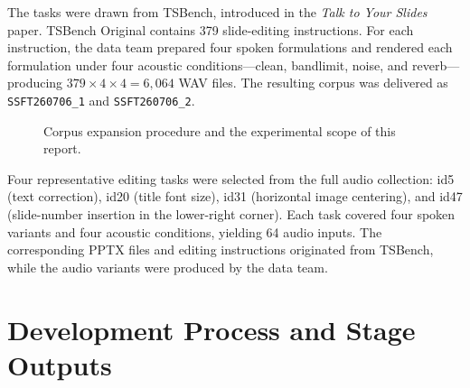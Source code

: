 \documentclass[11pt,a4paper,UTF8,fontset=fandol]{ctexart}
\begin{document}
The tasks were drawn from TSBench, introduced in the \textit{Talk to Your Slides} paper. TSBench Original contains 379 slide-editing instructions. For each instruction, the data team prepared four spoken formulations and rendered each formulation under four acoustic conditions---clean, bandlimit, noise, and reverb---producing $379\times4\times4=6{,}064$ WAV files. The resulting corpus was delivered as \texttt{SSFT260706\_1} and \texttt{SSFT260706\_2}.

\begin{figure}[H]
\centering
{}
\caption{Corpus expansion procedure and the experimental scope of this report.}
\end{figure}

Four representative editing tasks were selected from the full audio collection: id5 (text correction), id20 (title font size), id31 (horizontal image centering), and id47 (slide-number insertion in the lower-right corner). Each task covered four spoken variants and four acoustic conditions, yielding 64 audio inputs. The corresponding PPTX files and editing instructions originated from TSBench, while the audio variants were produced by the data team.

\section{Development Process and Stage Outputs}
\end{document}
